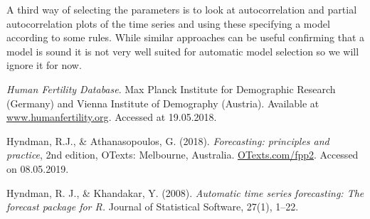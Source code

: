 \documentclass[a4paper, 12pt]{scrartcl}
\begin{document}
A third way of selecting the parameters is to look at autocorrelation and partial autocorrelation plots of the time series and using these specifying a model according to some rules.
While similar approaches can be useful confirming that a model is sound it is not very well suited for automatic model selection so we will ignore it for now.




\begin{thebibliography}{2}
	 \emph{Human Fertility Database}. Max Planck Institute for Demographic Research (Germany) and Vienna Institute of Demography (Austria). Available at \href{www.humanfertility.org}{www.humanfertility.org}. Accessed at 19.05.2018.
	
	 Hyndman, R.J., \& Athanasopoulos, G. (2018). \emph{Forecasting: principles and practice}, 2nd edition, OTexts: Melbourne, Australia. \href{https://otexts.com/fpp2/}{OTexts.com/fpp2}. Accessed on 08.05.2019.
	
	 Hyndman, R. J., \& Khandakar, Y. (2008). \emph{Automatic time series forecasting: The forecast package for R.} Journal of Statistical Software, 27(1), 1–22.
\end{thebibliography}
\end{document}
